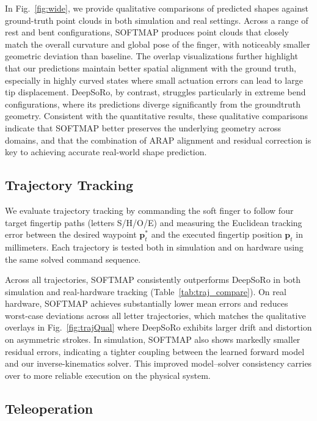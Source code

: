 \documentclass[letterpaper, 10 pt, conference]{ieeeconf}  %
\newcommand{\algname}{SOFTMAP\xspace}
\begin{document}
In Fig.~\ref{fig:wide}, we provide qualitative comparisons of predicted shapes against ground-truth point clouds in both simulation and real settings. Across a range of rest and bent configurations, \algname produces point clouds that closely match the overall curvature and global pose of the finger, with noticeably smaller geometric deviation than baseline. The overlap visualizations further highlight that our predictions maintain better spatial alignment with the ground truth, especially in highly curved states where small actuation errors can lead to large tip displacement. DeepSoRo, by contrast, struggles particularly in extreme bend configurations, where its predictions diverge significantly from the groundtruth geometry. Consistent with the quantitative results, these qualitative comparisons indicate that \algname better preserves the underlying geometry across domains, and that the combination of ARAP alignment and residual correction is key to achieving accurate real-world shape prediction.

\subsection{Trajectory Tracking}
\label{sec:traj_eval}

We evaluate trajectory tracking by commanding the soft finger to follow four target fingertip paths (letters S/H/O/E) and measuring the Euclidean tracking error between the desired waypoint $\mathbf{p}^*_t$ and the executed fingertip position $\mathbf{p}_t$ in millimeters. Each trajectory is tested both in simulation and on hardware using the same solved command sequence.

Across all trajectories, \algname consistently outperforms DeepSoRo in both simulation and real-hardware tracking (Table~\ref{tab:traj_compare}). On real hardware, \algname achieves substantially lower mean errors and reduces worst-case deviations across all letter trajectories, which matches the qualitative overlays in Fig.~\ref{fig:trajQual} where DeepSoRo exhibits larger drift and distortion on asymmetric strokes. In simulation, \algname also shows markedly smaller residual errors, indicating a tighter coupling between the learned forward model and our inverse-kinematics solver. This improved model–solver consistency carries over to more reliable execution on the physical system.

\subsection{Teleoperation}
\end{document}
